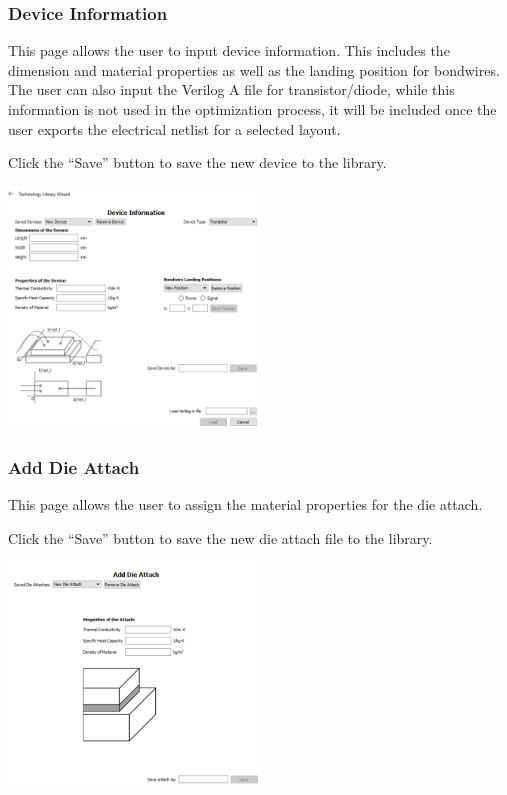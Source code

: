 \documentclass[11pt]{article}
\begin{document}
\pagebreak

\subsubsection{Device Information}
\label{sec-3-1-1}

This page allows the user to input device information. This includes the dimension and material properties as well as the landing position for bondwires. The user can also input the Verilog A file for transistor/diode, while this information is not used in the optimization process, it will be included once the user exports the electrical netlist for a selected layout.

Click the “Save” button to save the new device to the library.

\begin{center}
\includegraphics[width=0.5\textwidth]{./figs/33_TL-Device.png}
\end{center}


\subsubsection{Add Die Attach}
\label{sec-3-1-2}

This page allows the user to assign the material properties for the die attach. 

Click the “Save” button to save the new die attach file to the library.

\begin{center}
\includegraphics[width=0.5\textwidth]{./figs/34_TL-DieAttach.png}
\end{center}
\end{document}
